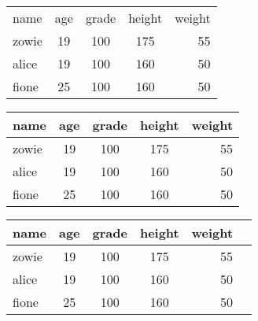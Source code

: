\documentclass{ctexart}
\begin{document}
    
    \begin{tabular}{l c c c r} %
        name & age & grade & height & weight \\  %
        zowie & 19 & 100 & 175 & 55 \\
        alice & 19 & 100 & 160 & 50 \\
        fione & 25 & 100 & 160 & 50 \\


    \end{tabular}






    \begin{tabular}{| l || c | c | c | r |} %
        \hline %
        name & age & grade & height & weight \\  
        \hline \hline %
        zowie & 19 & 100 & 175 & 55 \\
        \hline
        alice & 19 & 100 & 160 & 50 \\
        \hline
        fione & 25 & 100 & 160 & 50 \\
        \hline
    \end{tabular}


    \begin{tabular}{| l || c | c | c | r |p{2cm}} %
        \hline %
        name & age & grade & height & weight \\  
        \hline \hline %
        zowie & 19 & 100 & 175 & 55 \\
        \hline
        alice & 19 & 100 & 160 & 50 \\
        \hline
        fione & 25 & 100 & 160 & 50 \\
        \hline
    \end{tabular}
\end{document}

